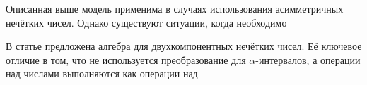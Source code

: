 Описанная выше модель применима в случаях использования асимметричных нечётких чисел. Однако существуют ситуации, когда  необходимо 

В статье \cite{Kanischeva} предложена алгебра для двухкомпонентных нечётких чисел. Её ключевое отличие в том, что не используется преобразование для $\alpha$-интервалов, а операции над числами выполняются как операции над
